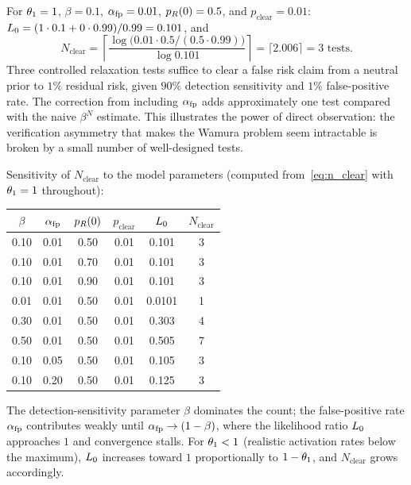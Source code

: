 \begin{remark}
\label{rem:concrete_numbers}
For $\theta_1 = 1$, $\beta = 0.1$, $\alpha_{\mathrm{fp}} = 0.01$,
$p_R(0) = 0.5$, and $p_{\mathrm{clear}} = 0.01$:
$L_0 = (1 \cdot 0.1 + 0 \cdot 0.99) / 0.99 = 0.101$, and
$$
N_{\mathrm{clear}} = \left\lceil
  \frac{\log\bigl(0.01 \cdot 0.5 / (0.5 \cdot 0.99)\bigr)}{\log 0.101}
\right\rceil = \lceil 2.006 \rceil = 3 \text{ tests}.
$$
Three controlled relaxation tests suffice to clear a false risk
claim from a neutral prior to $1\%$ residual risk, given $90\%$
detection sensitivity and $1\%$ false-positive rate.  The
correction from including $\alpha_{\mathrm{fp}}$ adds approximately one
test compared with the naive $\beta^N$ estimate.  This
illustrates the power of direct observation: the verification
asymmetry that makes the Wamura problem seem intractable is
broken by a small number of well-designed tests.

Sensitivity of $N_{\mathrm{clear}}$ to the model parameters
(computed from~\eqref{eq:n_clear} with $\theta_1 = 1$
throughout):

\begin{center}
\small
\begin{tabular}{@{}cccccc@{}}
\toprule
$\beta$ & $\alpha_{\mathrm{fp}}$ & $p_R(0)$ & $p_{\mathrm{clear}}$ & $L_0$ & $N_{\mathrm{clear}}$ \\
\midrule
0.10 & 0.01 & 0.50 & 0.01 & 0.101 & 3 \\
0.10 & 0.01 & 0.70 & 0.01 & 0.101 & 3 \\
0.10 & 0.01 & 0.90 & 0.01 & 0.101 & 3 \\
0.01 & 0.01 & 0.50 & 0.01 & 0.0101 & 1 \\
0.30 & 0.01 & 0.50 & 0.01 & 0.303 & 4 \\
0.50 & 0.01 & 0.50 & 0.01 & 0.505 & 7 \\
0.10 & 0.05 & 0.50 & 0.01 & 0.105 & 3 \\
0.10 & 0.20 & 0.50 & 0.01 & 0.125 & 3 \\
\bottomrule
\end{tabular}
\end{center}

The detection-sensitivity parameter $\beta$ dominates the count;
the false-positive rate $\alpha_{\mathrm{fp}}$ contributes weakly until
$\alpha_{\mathrm{fp}} \to (1-\beta)$, where the likelihood ratio $L_0$
approaches $1$ and convergence stalls.  For $\theta_1 < 1$
(realistic activation rates below the maximum), $L_0$
increases toward $1$ proportionally to $1 - \theta_1$, and
$N_{\mathrm{clear}}$ grows accordingly.
\end{remark}

